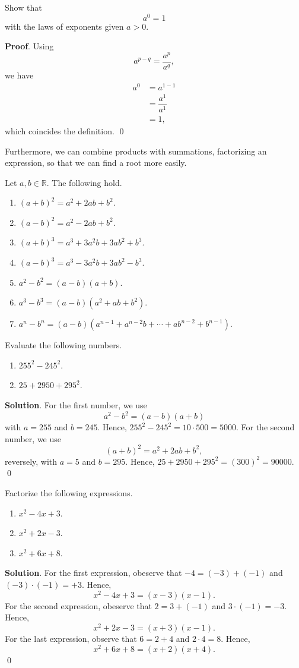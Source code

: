 \documentclass[11pt]{book}
\theoremstyle{break}
\theoremstyle{no_label}
\newcommand{\bbR}{\mathbb{R}}
\numberwithin{equation}{section}
\begin{document}
\begin{example}
    Show that $$a^0=1$$ with the laws of exponents given $a>0$.
\end{example}
\textbf{Proof}. Using $$a^{p-q}=\dfrac{a^p}{a^q},$$ we have 
\begin{align*}
    a^0&=a^{1-1}\\
    &=\dfrac{a^1}{a^1}\\
    &=1,
\end{align*}
which coincides the definition. \qed

Furthermore, we can combine products with summations, factorizing an expression, so that we can find a root more easily.

\begin{theorem}[Factorization]
    Let $a, b\in\bbR$. The following hold.
    \begin{enumerate}
        \item $(a+b)^2=a^2+2ab+b^2$.
        \item $(a-b)^2=a^2-2ab+b^2$.
        \item $(a+b)^3=a^3+3a^2b+3ab^2+b^3$.
        \item $(a-b)^3=a^3-3a^2b+3ab^2-b^3$.
        \item $a^2-b^2=(a-b)(a+b)$.
        \item $a^3-b^3=(a-b)(a^2+ab+b^2)$.
        \item $a^n-b^n=(a-b)(a^{n-1}+a^{n-2}b+\cdots+ab^{n-2}+b^{n-1})$.
    \end{enumerate}
\end{theorem}

\begin{example}
    Evaluate the following numbers.
    \begin{enumerate}
        \item $255^2-245^2$.
        \item $25+2950+295^2$.
    \end{enumerate}
\end{example}
\textbf{Solution}. For the first number, we use $$a^2-b^2=(a-b)(a+b)$$ with $a=255$ and $b=245$. Hence, $255^2-245^2=10\cdot500=5000$. For the second number, we use $$(a+b)^2=a^2+2ab+b^2,$$ reversely, with $a=5$ and $b=295$. Hence, $25+2950+295^2=(300)^2=90000$. \qed

\begin{example}
    Factorize the following expressions.
    \begin{enumerate}
        \item $x^2-4x+3$.
        \item $x^2+2x-3$.
        \item $x^2+6x+8$.
    \end{enumerate}
\end{example}
\textbf{Solution}. For the first expression, obeserve that $-4=(-3)+(-1)$ and $(-3)\cdot(-1)=+3$. Hence, $$x^2-4x+3=(x-3)(x-1).$$ For the second expression, obeserve that $2=3+(-1)$ and $3\cdot(-1)=-3$. Hence, $$x^2+2x-3=(x+3)(x-1).$$ For the last expression, observe that $6=2+4$ and $2\cdot4=8$. Hence, $$x^2+6x+8=(x+2)(x+4).$$ \qed
\end{document}
